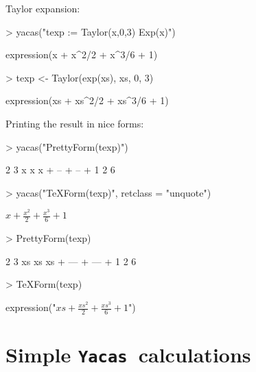 \documentclass[]{article}
\def\yac{\texttt{Yacas}}
\begin{document}
Taylor expansion:
\begin{Schunk}
\begin{Sinput}
> yacas("texp := Taylor(x,0,3) Exp(x)")
\end{Sinput}
\begin{Soutput}
expression(x + x^2/2 + x^3/6 + 1)
\end{Soutput}
\end{Schunk}

\begin{Schunk}
\begin{Sinput}
> texp <- Taylor(exp(xs), xs, 0, 3)
\end{Sinput}
\begin{Soutput}
expression(xs + xs^2/2 + xs^3/6 + 1)
\end{Soutput}
\end{Schunk}


Printing the result in nice forms:
\begin{Schunk}
\begin{Sinput}
> yacas("PrettyForm(texp)")
\end{Sinput}
\begin{Soutput}
     2    3    
    x    x     
x + -- + -- + 1
    2    6     
\end{Soutput}
\begin{Sinput}
> yacas("TeXForm(texp)", retclass = "unquote")
\end{Sinput}
\begin{Soutput}
$x + \frac{x ^{2}}{2}  + \frac{x ^{3}}{6}  + 1$
\end{Soutput}
\end{Schunk}

\begin{Schunk}
\begin{Sinput}
> PrettyForm(texp)
\end{Sinput}
\begin{Soutput}
       2     3    
     xs    xs     
xs + --- + --- + 1
      2     6     
\end{Soutput}
\begin{Sinput}
> TeXForm(texp)
\end{Sinput}
\begin{Soutput}
expression("$xs + \frac{xs ^{2}}{2}  + \frac{xs ^{3}}{6}  + 1$")
\end{Soutput}
\end{Schunk}



\section{Simple \yac\ calculations}
\end{document}

